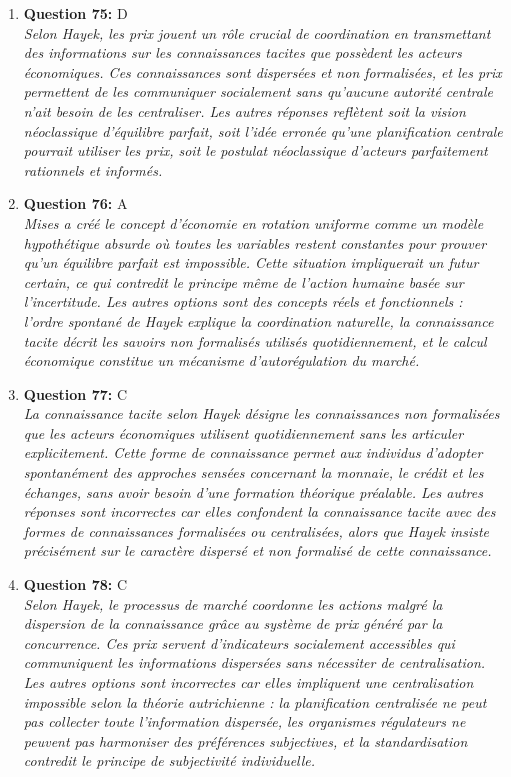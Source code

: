 \documentclass[12pt,a4paper]{article}
\begin{document}
\begin{enumerate}
\item \textbf{Question 75:} D
\\ \textit{Selon Hayek, les prix jouent un rôle crucial de coordination en transmettant des informations sur les connaissances tacites que possèdent les acteurs économiques. Ces connaissances sont dispersées et non formalisées, et les prix permettent de les communiquer socialement sans qu'aucune autorité centrale n'ait besoin de les centraliser. Les autres réponses reflètent soit la vision néoclassique d'équilibre parfait, soit l'idée erronée qu'une planification centrale pourrait utiliser les prix, soit le postulat néoclassique d'acteurs parfaitement rationnels et informés.}

\item \textbf{Question 76:} A
\\ \textit{Mises a créé le concept d'économie en rotation uniforme comme un modèle hypothétique absurde où toutes les variables restent constantes pour prouver qu'un équilibre parfait est impossible. Cette situation impliquerait un futur certain, ce qui contredit le principe même de l'action humaine basée sur l'incertitude. Les autres options sont des concepts réels et fonctionnels : l'ordre spontané de Hayek explique la coordination naturelle, la connaissance tacite décrit les savoirs non formalisés utilisés quotidiennement, et le calcul économique constitue un mécanisme d'autorégulation du marché.}

\item \textbf{Question 77:} C
\\ \textit{La connaissance tacite selon Hayek désigne les connaissances non formalisées que les acteurs économiques utilisent quotidiennement sans les articuler explicitement. Cette forme de connaissance permet aux individus d'adopter spontanément des approches sensées concernant la monnaie, le crédit et les échanges, sans avoir besoin d'une formation théorique préalable. Les autres réponses sont incorrectes car elles confondent la connaissance tacite avec des formes de connaissances formalisées ou centralisées, alors que Hayek insiste précisément sur le caractère dispersé et non formalisé de cette connaissance.}

\item \textbf{Question 78:} C
\\ \textit{Selon Hayek, le processus de marché coordonne les actions malgré la dispersion de la connaissance grâce au système de prix généré par la concurrence. Ces prix servent d'indicateurs socialement accessibles qui communiquent les informations dispersées sans nécessiter de centralisation. Les autres options sont incorrectes car elles impliquent une centralisation impossible selon la théorie autrichienne : la planification centralisée ne peut pas collecter toute l'information dispersée, les organismes régulateurs ne peuvent pas harmoniser des préférences subjectives, et la standardisation contredit le principe de subjectivité individuelle.}


\end{enumerate}
\end{document}
